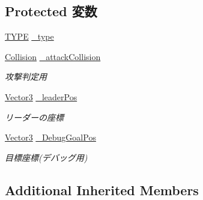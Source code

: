 \subsection*{Protected 変数}
\begin{DoxyCompactItemize}
\item 
\hyperlink{class_ally_base_a415be0ac5999cacff3c36db435115e91}{T\-Y\-P\-E} \hyperlink{class_ally_base_a404a0b9f3665f8428e8f4605c11b4aa8}{\-\_\-type}
\item 
\hyperlink{class_collision}{Collision} \hyperlink{class_ally_base_aa50dc4d93b0aec2d2ee68eb413099bee}{\-\_\-attack\-Collision}
\begin{DoxyCompactList}\small\item\em 攻撃判定用 \end{DoxyCompactList}\item 
\hyperlink{struct_vector3}{Vector3} \hyperlink{class_ally_base_a645bdf98a2819d860f30637ffa82fe35}{\-\_\-leader\-Pos}
\begin{DoxyCompactList}\small\item\em リーダーの座標 \end{DoxyCompactList}\item 
\hyperlink{struct_vector3}{Vector3} \hyperlink{class_ally_base_af86598e67ba582fac7383caee977458d}{\-\_\-\-Debug\-Goal\-Pos}
\begin{DoxyCompactList}\small\item\em 目標座標(デバッグ用) \end{DoxyCompactList}\end{DoxyCompactItemize}
\subsection*{Additional Inherited Members}


